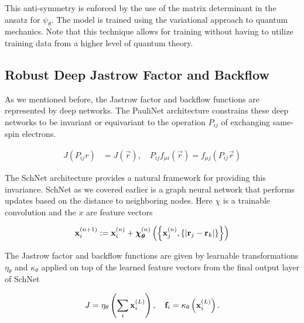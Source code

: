 \documentclass[book.tex]{subfiles}
\begin{document}
This anti-symmetry is enforced by the use of the matrix determinant in the ansatz for $\psi_\theta$. The model is trained using the variational approach to quantum mechanics. Note that this technique allows for training without having to utilize training data from a higher level of quantum theory.

\subsection{Robust Deep Jastrow Factor and Backflow}

As we mentioned before, the Jastrow factor and backflow functions are represented by deep networks. The PauliNet architecture constrains these deep networks to be invariant or equivariant to the operation $P_{ij}$ of exchanging same-spin electrons.

\begin{align}
J(P_{ij}r) &= J(\vec{r}), \quad P_{ij}{f}_{\mu i}(\vec{r})=f_{\mu j}(P_{ij}\vec{r})
\end{align}

The SchNet architecture provides a natural framework for providing this invariance. SchNet as we covered earlier is a graph neural network that performs updates based on the distance to neighboring nodes. Here $\chi$ is a trainable convolution and the $x$ are feature vectors

\begin{align}
{{\bf{x}}}_{i}^{(n+1)}:={{\bf{x}}}_{i}^{(n)}+{\boldsymbol{\chi }}_{{\boldsymbol{\theta }}}^{(n)}\left(\left\{{{\bf{x}}}_{{{j}}}^{({{n}})},\{| {{\bf{r}}}_{j}-{{\bf{r}}}_{k}| \}\right\}\right)
\end{align}

The Jastrow factor and backflow functions are given by learnable transformations $\eta_\theta$ and $\kappa_\theta$ applied on top of the learned feature vectors from the final output layer of SchNet

\begin{align}
J ={\eta}_{\theta}\left(\sum_{i}{\bf{x}}_i^{(L)}\right),\quad {\bf{f}}_{i} = \kappa_{\theta}\left({\bf{x}}_i^{(L)}\right).
\end{align}




\end{document}
